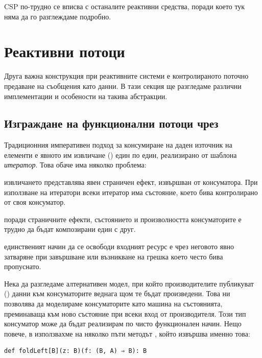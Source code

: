 CSP по-трудно се вписва с останалите реактивни средства, поради което тук няма да го разглеждаме подробно.

\section{Реактивни потоци}
\label{sec:reactive-streams}

Друга важна конструкция при реактивните системи е контролираното поточно предаване на съобщения като данни. В тази секция ще разгледаме различни имплементации и особености на такива абстракции.

\subsection{Изграждане на функционални потоци чрез }
\label{sec:iteratee}

Традиционния императивен подход за консумиране на даден източник на елементи е явното им извличане () един по един, реализирано от шаблона \emph{итератор}. Това обаче има няколко проблема:

\begin{itemize*}
  \item извличането представлява явен страничен ефект, извършван от консуматора. При използване на итератори всеки итератор има състояние, което бива контролирано от своя консуматор.
  
  \item поради страничните ефекти, състоянието и произволността консуматорите е трудно да бъдат композирани един с друг.
  
  \item единственият начин да се освободи входният ресурс е чрез неговото явно затваряне при завършване или възникване на грешка което често бива пропуснато.
\end{itemize*}

Нека да разгледаме алтернативен модел, при който производителите публикуват () данни към консуматорите веднага щом те бъдат произведени. Това ни позволява да моделираме консуматорите като машина на състоянията, преминаваща към ново състояние при всеки вход от производителя. Този тип консуматор може да бъдат реализирам по чисто функционален начин. Нещо повече, в  използвахме на няколко пъти методът , който извършва именно това:

\begin{lstlisting}
def foldLeft[B](z: B)(f: (B, A) ⇒ B): B
\end{lstlisting}

